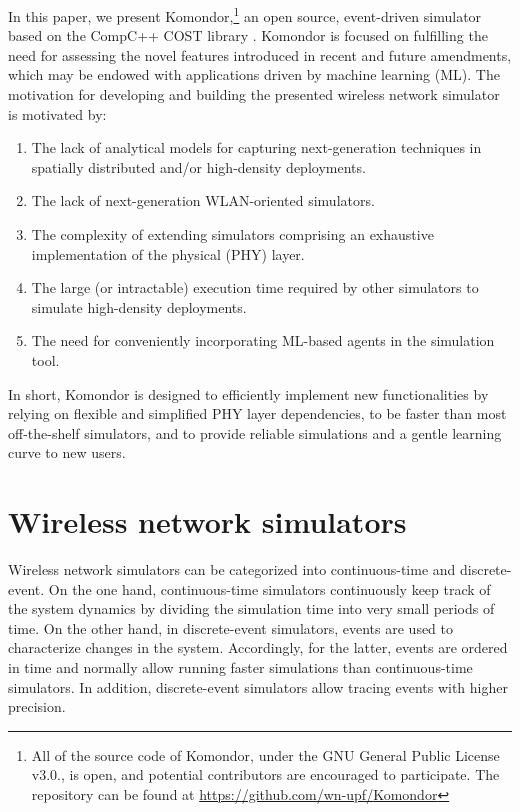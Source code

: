 \documentclass{article}
\begin{document}
	In this paper, we present Komondor,\footnote{All of the source code of Komondor, under the GNU General Public License v3.0., is open, and potential contributors are encouraged to participate. The repository can be found at \url{https://github.com/wn-upf/Komondor}} an open source, event-driven simulator based on the CompC++ COST library \cite{chen2002reusing}. Komondor is focused on fulfilling the need for assessing the novel features introduced in recent and future amendments, which may be endowed with applications driven by machine learning (ML). The motivation for developing and building the presented wireless network simulator is motivated by: 
	\begin{enumerate}[label=\roman*)]
		\item The lack of analytical models for capturing next-generation techniques in spatially distributed and/or high-density deployments.
		\item The lack of next-generation WLAN-oriented simulators.
		\item The complexity of extending simulators comprising an exhaustive implementation of the physical (PHY) layer.
		\item The large (or intractable) execution time required by other simulators to simulate high-density deployments.
		\item The need for conveniently incorporating ML-based agents in the simulation tool.
	\end{enumerate}
	In short, Komondor is designed to efficiently implement new functionalities by relying on flexible and simplified PHY layer dependencies, to be faster than most off-the-shelf simulators, and to provide reliable simulations and a gentle learning curve to new users. 
	
	\section{Wireless network simulators}
	\label{section:related_work}
	
	Wireless network simulators can be categorized into continuous-time and discrete-event. On the one hand, continuous-time simulators continuously keep track of the system dynamics by dividing the simulation time into very small periods of time. On the other hand, in discrete-event simulators, events are used to characterize changes in the system. Accordingly, for the latter, events are ordered in time and normally allow running faster simulations than continuous-time simulators. In addition, discrete-event simulators allow tracing events with higher precision.
	
\end{document}
